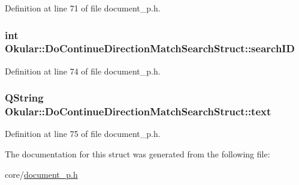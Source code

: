 Definition at line 71 of file document\+\_\+p.\+h.

\hypertarget{structOkular_1_1DoContinueDirectionMatchSearchStruct_a311791184c19130a099f65f84384db6e}{
\subsubsection[{search\+I\+D}]{\setlength{\rightskip}{0pt plus 5cm}int Okular\+::\+Do\+Continue\+Direction\+Match\+Search\+Struct\+::search\+I\+D}}\label{structOkular_1_1DoContinueDirectionMatchSearchStruct_a311791184c19130a099f65f84384db6e}


Definition at line 74 of file document\+\_\+p.\+h.

\hypertarget{structOkular_1_1DoContinueDirectionMatchSearchStruct_a69c1b9beb5762d997a0dfeff5c714239}{
\subsubsection[{text}]{\setlength{\rightskip}{0pt plus 5cm}Q\+String Okular\+::\+Do\+Continue\+Direction\+Match\+Search\+Struct\+::text}}\label{structOkular_1_1DoContinueDirectionMatchSearchStruct_a69c1b9beb5762d997a0dfeff5c714239}


Definition at line 75 of file document\+\_\+p.\+h.



The documentation for this struct was generated from the following file\+:\begin{DoxyCompactItemize}
\item 
core/\hyperlink{document__p_8h}{document\+\_\+p.\+h}\end{DoxyCompactItemize}
